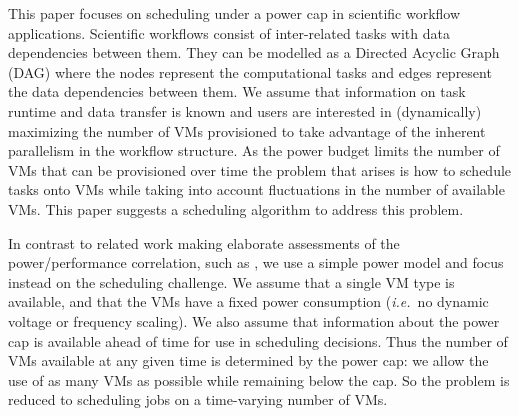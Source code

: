 \documentclass[10pt, conference, compsocconf]{IEEEtran} %
\newcommand{\ie}{\textit{i.e.}\ }
\begin{document}

This paper focuses on scheduling under a power cap in scientific workflow applications.
Scientific workflows \cite{deelmanbook} consist of inter-related tasks with data dependencies between them.
They can be modelled as a Directed Acyclic Graph (DAG) where the nodes represent the computational tasks and edges represent the data dependencies between them.
We assume that information on task runtime and data transfer is known and users are interested in (dynamically) maximizing the number of VMs provisioned to take advantage of the inherent parallelism in the workflow structure.
As the power budget limits the number of VMs that can be provisioned over time the problem that arises is how to schedule tasks onto VMs while taking into account fluctuations in the number of available VMs.
This paper suggests a scheduling algorithm to address this problem.

In contrast to related work making elaborate assessments of the power/performance correlation, such as \cite{bailey2014adaptive}, we use a simple power model and focus instead on the scheduling challenge.
We assume that a single VM type is available, and that the VMs have a fixed power consumption (\ie no dynamic voltage or frequency scaling).
We also assume that information about the power cap is available ahead of time for use in scheduling decisions.
Thus the number of VMs available at any given time is determined by the power cap: we allow the use of as many VMs as possible while remaining below the cap.
So the problem is reduced to scheduling jobs on a time-varying number of VMs.
\end{document}
